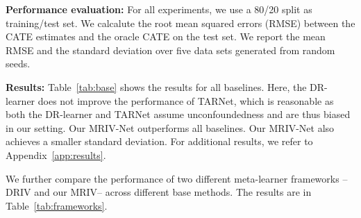 \documentclass{article} %
\newcommand{\frameworkname}{MRIV\xspace}
\newcommand{\modelname}{\mbox{MRIV-Net}\xspace}
\theoremstyle{definition}
\theoremstyle{plain}
\begin{document}
\textbf{Performance evaluation:} For all experiments, we use a 80/20 split as training/test set. We calcalute the root mean squared errors (RMSE) between the CATE estimates and the oracle CATE on the test set. We report the mean RMSE and the standard deviation over five data sets generated from random seeds.

\textbf{Results:}
Table~\ref{tab:base} shows the results for all baselines. Here, the DR-learner does not improve the performance of TARNet, which is reasonable as both the DR-learner and TARNet assume unconfoundedness and are thus biased in our setting. Our \modelname outperforms all baselines. Our \modelname also achieves a smaller standard deviation. For additional results, we refer to Appendix~\ref*{app:results}.

We further compare the performance of two different meta-learner frameworks -- DRIV \citep{Syrgkanis.2019} and our \frameworkname -- across different base methods. The results are in Table~\ref{tab:frameworks}.
\end{document}
